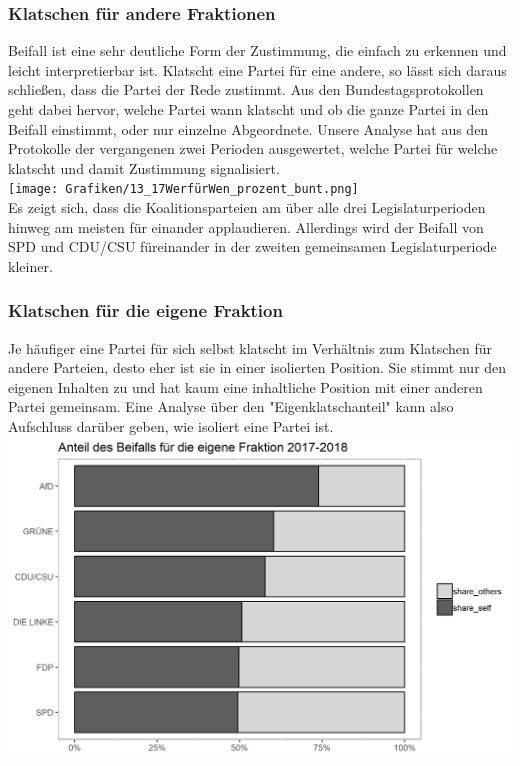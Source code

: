 \subsubsection{Klatschen für andere Fraktionen}

 Beifall ist eine sehr deutliche Form der Zustimmung, die einfach zu erkennen und leicht interpretierbar ist. Klatscht eine Partei für eine andere, so lässt sich daraus schließen, dass die Partei der Rede zustimmt. Aus den Bundestagsprotokollen geht dabei hervor, welche Partei wann klatscht und ob die ganze Partei in den Beifall einstimmt, oder nur einzelne Abgeordnete. Unsere Analyse hat aus den Protokolle der vergangenen zwei Perioden ausgewertet, welche Partei für welche klatscht und damit Zustimmung signalisiert.   \\


\texttt{[image: Grafiken/13\_17WerfürWen\_prozent\_bunt.png]}\\
Es zeigt sich, dass die Koalitionsparteien am über alle drei Legislaturperioden hinweg am meisten für einander applaudieren. Allerdings wird der Beifall von SPD und CDU/CSU füreinander in der zweiten gemeinsamen Legislaturperiode kleiner.\\

\subsubsection{Klatschen für die eigene Fraktion}
 \noindent Je häufiger eine Partei für sich selbst klatscht im Verhältnis zum Klatschen für andere Parteien, desto eher ist sie in einer isolierten Position. Sie stimmt nur den eigenen Inhalten zu und hat kaum eine inhaltliche Position mit einer anderen Partei gemeinsam. Eine Analyse über den "Eigenklatschanteil" kann also Aufschluss darüber geben, wie isoliert eine Partei ist. \\

\includegraphics[width=\linewidth]{Grafiken/17_eigenklatschanteil.png}

